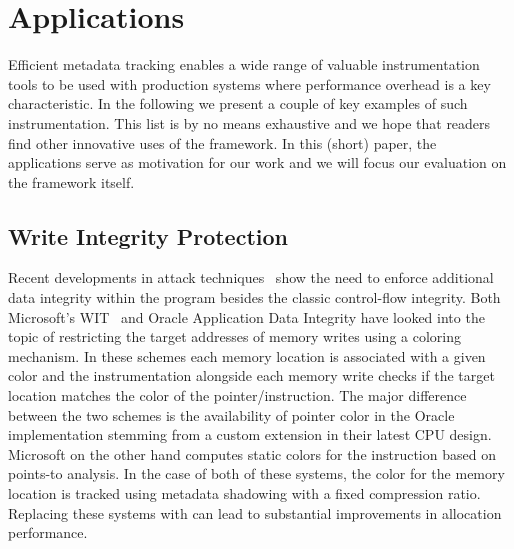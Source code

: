 \section{Applications}
\label{sec:applications}

Efficient metadata tracking enables a wide range of valuable instrumentation
tools to be used with production systems where performance overhead is a
key characteristic. In the following we present a couple of key examples 
of such instrumentation.
This list is by no means exhaustive and we hope that readers
find other innovative uses of the framework. In this (short) paper, the applications  serve as motivation for our work and we will focus our evaluation on the framework itself.

\subsection{Write Integrity Protection}

Recent developments in attack techniques~\cite{carlini2015control,evans2015control,schuster2015counterfeit}
show the need to enforce additional data 
integrity within the program besides the classic control-flow integrity. 
Both Microsoft's WIT~\cite{akritidis2008preventing} and Oracle Application Data Integrity have looked into the 
topic of restricting the target addresses of memory writes using a coloring mechanism. 
In these schemes each memory location is associated with a given color and the instrumentation
alongside each memory write checks if the target location matches the color of
the pointer/instruction.
The major difference between the two schemes is the availability
of pointer color in the Oracle implementation stemming from a custom extension in
their latest CPU design. Microsoft on the other hand computes static colors for
the instruction based on points-to analysis.
In the case of both of these systems, the color for the memory location is tracked
using metadata shadowing with a fixed compression ratio.
Replacing these systems with \projectname{} can lead to substantial improvements  in  allocation performance.

